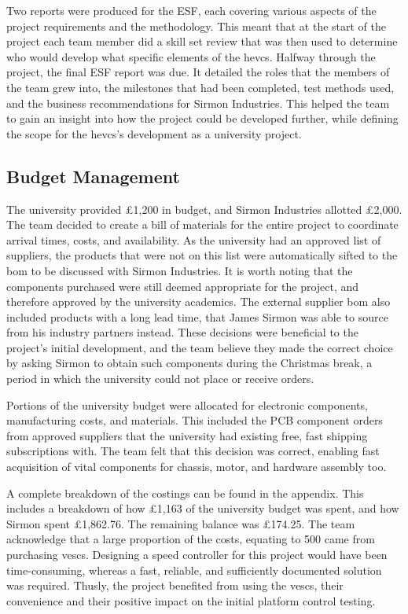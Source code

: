 \documentclass [12pt]{article}
\begin{document}
Two reports were produced for the ESF, each covering various aspects of the project requirements and the methodology. This meant that at the start of the project each team member did a skill set review that was then used to determine who would develop what specific elements of the \gls{hevcs}. Halfway through the project, the final ESF report was due. It detailed the roles that the members of the team grew into, the milestones that had been completed, test methods used, and the business recommendations for Sirmon Industries. This helped the team to gain an insight into how the project could be developed further, while defining the scope for the \gls{hevcs}’s development as a university project.  

\subsection{Budget Management}

The university provided £1,200 in budget, and Sirmon Industries allotted £2,000. The team decided to create a bill of materials for the entire project to coordinate arrival times, costs, and availability. As the university had an approved list of suppliers, the products that were not on this list were automatically sifted to the \gls{bom} to be discussed with Sirmon Industries. It is worth noting that the components purchased were still deemed appropriate for the project, and therefore approved by the university academics. The external supplier \gls{bom} also included products with a long lead time, that James Sirmon was able to source from his industry partners instead. These decisions were beneficial to the project’s initial development, and the team believe they made the correct choice by asking Sirmon to obtain such components during the Christmas break, a period in which the university could not place or receive orders.  

Portions of the university budget were allocated for electronic components, manufacturing costs, and materials. This included the PCB component orders from approved suppliers that the university had existing free, fast shipping subscriptions with. The team felt that this decision was correct, enabling fast acquisition of vital components for chassis, motor, and hardware assembly too.  

A complete breakdown of the costings can be found in the appendix. This includes a breakdown of how £1,163 of the university budget was spent, and how Sirmon spent £1,862.76. The remaining balance was £174.25. The team acknowledge that a large proportion of the costs, equating to 500 came from purchasing \gls{vesc}s. Designing a speed controller for this project would have been time-consuming, whereas a fast, reliable, and sufficiently documented solution was required. Thusly, the project benefited from using the \gls{vesc}s, their convenience and their positive impact on the initial platform control testing.
\end{document}
